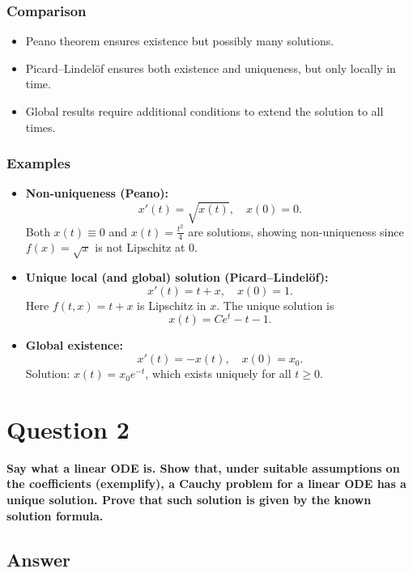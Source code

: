 \documentclass[12pt,a4paper]{book}
\theoremstyle{remark}
\begin{document}
\subsubsection*{Comparison}
\begin{itemize}
    \item Peano theorem ensures existence but possibly many solutions.
    \item Picard–Lindelöf ensures both existence and uniqueness, but only locally in time.
    \item Global results require additional conditions to extend the solution to all times.
\end{itemize}

\subsubsection*{Examples}
\begin{itemize}
    \item \textbf{Non-uniqueness (Peano):} 
    \[
    x'(t) = \sqrt{x(t)}, \quad x(0)=0.
    \] 
    Both $x(t)\equiv 0$ and $x(t) = \tfrac{t^2}{4}$ are solutions, showing non-uniqueness since $f(x)=\sqrt{x}$ is not Lipschitz at $0$.

    \item \textbf{Unique local (and global) solution (Picard–Lindelöf):} 
    \[
    x'(t) = t+x, \quad x(0)=1.
    \]
    Here $f(t,x)=t+x$ is Lipschitz in $x$. The unique solution is
    \[
    x(t) = Ce^t - t - 1.
    \]

    \item \textbf{Global existence:} 
    \[
    x'(t) = -x(t), \quad x(0)=x_0.
    \]
    Solution: $x(t)=x_0e^{-t}$, which exists uniquely for all $t\geq 0$.
\end{itemize}













\newpage
\section{Question 2}
\textbf{Say what a linear ODE is. Show that, under suitable assumptions on the coefficients (exemplify), a Cauchy problem for a linear ODE has a unique solution. Prove that such solution is given by the known solution formula.}

\subsection*{Answer}
\end{document}
